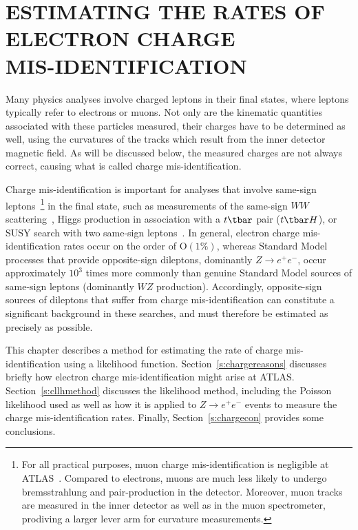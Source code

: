 
\chapter{ESTIMATING THE RATES OF ELECTRON CHARGE
  \\MIS-IDENTIFICATION}\label{c:cid}

Many physics analyses involve charged leptons in their final states, where
leptons typically refer to electrons or muons. Not only are the kinematic
quantities associated with these particles measured, their charges have to be
determined as well, using the curvatures of the tracks which result from the
inner detector magnetic field. As will be discussed below, the measured charges
are not always correct, causing what is called charge mis-identification.

Charge mis-identification is important for analyses that involve same-sign
leptons~\footnote{For all practical purposes, muon charge mis-identification is
negligible at ATLAS~\cite{muonchargemid}. Compared to electrons, muons are much
less likely to undergo bremsstrahlung and pair-production in the detector.
Moreover, muon tracks are measured in the inner detector as well as in the muon
spectrometer, prodiving a larger lever arm for curvature measurements.} in the
final state, such as measurements of the same-sign $WW$
scattering~\cite{sswwscatting}, Higgs production in association with a $t\tbar$
pair ($t\tbar H$), or SUSY search with two same-sign
leptons~\cite{ssssleptons}. In general, electron charge mis-identification
rates occur on the order of $\text{O}(1\%)$, whereas Standard Model processes
that provide opposite-sign dileptons, dominantly $Z\to e^+e^-$, occur
approximately $10^3$ times more commonly than genuine Standard Model sources of
same-sign leptons (dominantly $WZ$ production). Accordingly, opposite-sign
sources of dileptons that suffer from charge mis-identification can constitute
a significant background in these searches, and must therefore be estimated as
precisely as possible.


This chapter describes a method for estimating the rate of charge
mis-identification using a likelihood function. Section~\ref{s:chargereasons}
discusses briefly how electron charge mis-identification might arise at ATLAS.
Section~\ref{s:cllhmethod} discusses the likelihood method, including the
Poisson likelihood used as well as how it is applied to $Z\to e^+e^-$ events to
measure the charge mis-identification rates. Finally, Section~\ref{s:chargecon}
provides some conclusions.

